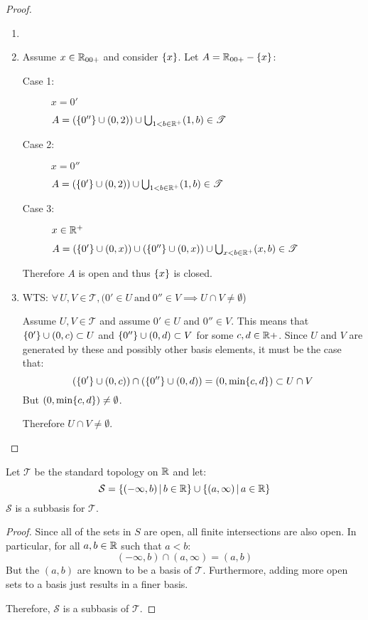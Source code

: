 \documentclass[letterpaper,12pt,fleqn]{article}
\newcommand{\T}{\mathscr{T}}
\renewcommand{\S}{\mathcal{S}}
\begin{document}
\begin{proof}
  \begin{enumerate}
  \item[]
  \item Assume \(x\in\mathbb{R}_{00+}\) and consider \(\{x\}\).  Let \(A=\mathbb{R}_{00+}-\{x\}\):

    \begin{description}
    \item[Case 1:] \(x=0'\)

      \(A=(\set{0''}\cup(0,2))\cup\bigcup_{1<b\in\R^+}(1,b)\in\T\)
      
    \item[Case 2:] \(x=0''\)

      \(A=(\set{0'}\cup(0,2))\cup\bigcup_{1<b\in\R^+}(1,b)\in\T\)

    \item[Case 3:] \(x\in\mathbb{R}^+\)

      \(A=(\set{0'}\cup(0,x))\cup(\set{0''}\cup(0,x))\cup\bigcup_{x<b\in\R^+}(x,b)\in\T\)
    \end{description}

    Therefore \(A\) is open and thus \(\{x\}\) is closed.

  \item WTS: \(\forall\,U,V\in\T,(0'\in U\ \text{and}\ 0''\in V\implies U\cap V\ne\emptyset\))

    Assume \(U,V\in\T\) and assume \(0'\in U\) and \(0''\in V\).  This means that \(\{0'\}\cup(0,c)\subset U\)
    and \(\{0''\}\cup(0,d)\subset V\) for some \(c,d\in\mathbb{R}+\).  Since \(U\) and \(V\) are generated by these and
    possibly other basis elements, it must be the case that:
    \[(\{0'\}\cup(0,c))\cap(\{0''\}\cup(0,d))=(0,\min\{c,d\})\subset{U\cap V}\]
    But \((0,\min\{c,d\})\ne\emptyset\).

    Therefore \(U\cap V\ne\emptyset\).
  \end{enumerate}
\end{proof}

\begin{theorem}[Exercise 3.14]
  Let \(\T\) be the standard topology on \(\mathbb{R}\) and let:
  \[\S=\setb{(-\infty,b)}{b\in\R}\cup\setb{(a,\infty)}{a\in\R}\]
  \(\S\) is a subbasis for \(\T\).
\end{theorem}

\begin{proof}
  Since all of the sets in \(S\) are open, all finite intersections are also open.  In particular, for all
  \(a,b\in\mathbb{R}\) such that \(a<b\):
  \[(-\infty,b)\cap(a,\infty)=(a,b)\]
  But the \((a,b)\) are known to be a basis of \(\T\).  Furthermore, adding more open sets to a basis just results
  in a finer basis.

  Therefore, \(\S\) is a subbasis of \(\T\).
\end{proof}
\end{document}
